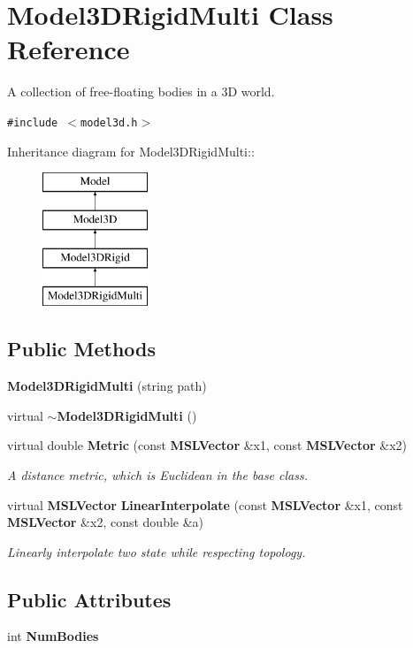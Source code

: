 \section{Model3DRigid\-Multi  Class Reference}
\label{classModel3DRigidMulti}
A collection of free-floating bodies in a 3D world. 


{\tt \#include $<$model3d.h$>$}

Inheritance diagram for Model3DRigid\-Multi::\begin{figure}[H]
\begin{center}
\leavevmode
\includegraphics[height=4cm]{classModel3DRigidMulti}
\end{center}
\end{figure}
\subsection*{Public Methods}
\begin{CompactItemize}
\item 
{\bf Model3DRigid\-Multi} (string path)
\item 
virtual {\bf $\sim$Model3DRigid\-Multi} ()
\item 
virtual double {\bf Metric} (const {\bf MSLVector} \&x1, const {\bf MSLVector} \&x2)
\begin{CompactList}\small\item\em A distance metric, which is Euclidean in the base class.\item\end{CompactList}\item 
virtual {\bf MSLVector} {\bf Linear\-Interpolate} (const {\bf MSLVector} \&x1, const {\bf MSLVector} \&x2, const double \&a)
\begin{CompactList}\small\item\em Linearly interpolate two state while respecting topology.\item\end{CompactList}\end{CompactItemize}
\subsection*{Public Attributes}
\begin{CompactItemize}
\item 
int {\bf Num\-Bodies}
\end{CompactItemize}


